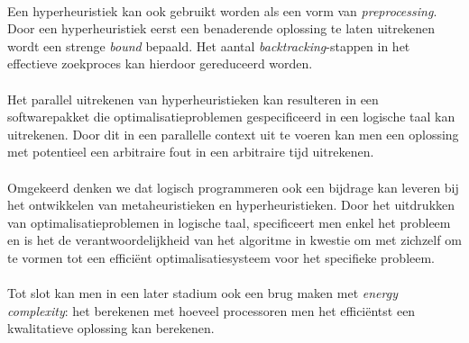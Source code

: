 \paragraph{}
Een hyperheuristiek kan ook gebruikt worden als een vorm van \emph{preprocessing}. Door een hyperheuristiek eerst een benaderende oplossing te laten uitrekenen wordt een strenge \emph{bound} bepaald. Het aantal \emph{backtracking}-stappen in het effectieve zoekproces kan hierdoor gereduceerd worden.

\paragraph{}
Het parallel uitrekenen van hyperheuristieken kan resulteren in een softwarepakket die optimalisatieproblemen gespecificeerd in een logische taal kan uitrekenen. Door dit in een parallelle context uit te voeren kan men een oplossing met potentieel een arbitraire fout in een arbitraire tijd uitrekenen.

\paragraph{}
Omgekeerd denken we dat logisch programmeren ook een bijdrage kan leveren bij het ontwikkelen van metaheuristieken en hyperheuristieken. Door het uitdrukken van optimalisatieproblemen in logische taal, specificeert men enkel het probleem en is het de verantwoordelijkheid van het algoritme in kwestie om met zichzelf om te vormen tot een effici\"ent optimalisatiesysteem voor het specifieke probleem.

\paragraph{}
Tot slot kan men in een later stadium ook een brug maken met \emph{energy complexity}\cite{Roy:2013:ECM:2422436.2422470,conf/icpp/KorthikantiAG11}: het berekenen met hoeveel processoren men het effici\"entst een kwalitatieve oplossing kan berekenen.

